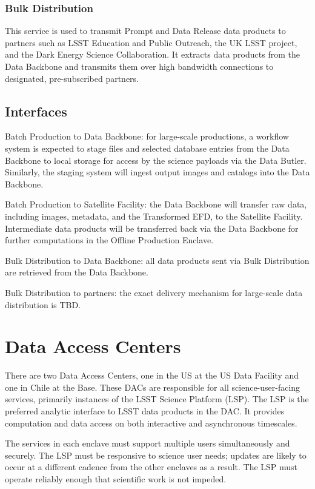\documentclass[DM,toc,lsstdraft]{lsstdoc}
\begin{document}
\subsubsection{Bulk Distribution}\label{bulk-distribution}

This service is used to transmit Prompt and Data Release data products to partners such as LSST Education and Public Outreach, the UK LSST project, and the Dark Energy Science Collaboration.
It extracts data products from the Data Backbone and transmits them over high bandwidth connections to designated, pre-subscribed partners.


\subsection{Interfaces}\label{us-general-production-interfaces}

Batch Production to Data Backbone: for large-scale productions, a workflow
system is expected to stage files and selected database entries from the
Data Backbone to local storage for access by the science payloads via
the Data Butler. Similarly, the staging system will ingest output images
and catalogs into the Data Backbone.

Batch Production to Satellite Facility: the Data Backbone will transfer raw data, including images, metadata, and the Transformed EFD, to the Satellite Facility.
Intermediate data products will be transferred back via the Data Backbone for further computations in the Offline Production Enclave.

Bulk Distribution to Data Backbone: all data products sent via Bulk Distribution are retrieved from the Data Backbone.

Bulk Distribution to partners: the exact delivery mechanism for
large-scale data distribution is TBD.


\section{Data Access Centers}\label{data-access-centers}

There are two Data Access Centers, one in the US at the US Data Facility and one in
Chile at the Base. These DACs are responsible for all
science-user-facing services, primarily instances of the LSST Science
Platform (LSP). The LSP is the preferred analytic interface to LSST data
products in the DAC. It provides computation and data access on both
interactive and asynchronous timescales.

The services in each enclave must support multiple users simultaneously
and securely. The LSP must be responsive to science user needs; updates
are likely to occur at a different cadence from the other enclaves as a
result. The LSP must operate reliably enough that scientific work is not
impeded.
\end{document}
